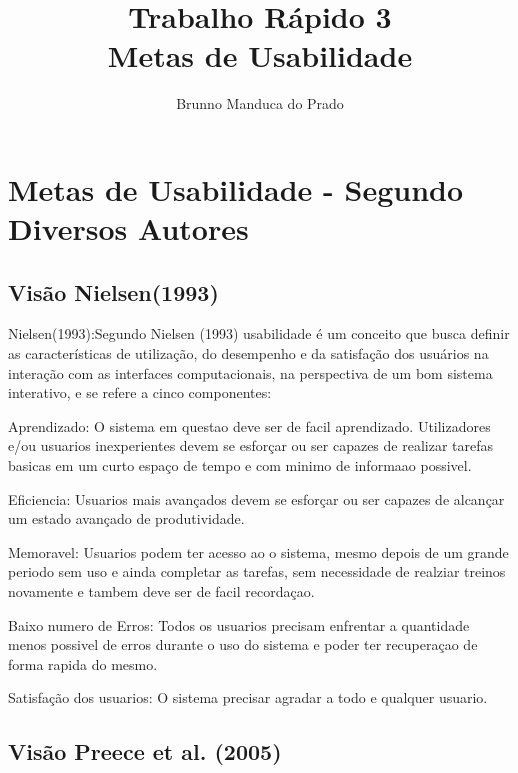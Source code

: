 \documentclass[12pt]{article}
\title{Trabalho Rápido 3\\Metas de Usabilidade}
\author{Brunno Manduca do Prado}
\begin{document}
 

\maketitle

\begin{abstract}

\end{abstract}
     
\begin{resumo} 

\end{resumo}


\section{Metas de Usabilidade - Segundo Diversos Autores\\}

\subsection{Visão Nielsen(1993)}

		Nielsen(1993):Segundo Nielsen (1993) usabilidade é um conceito que busca definir as características de 
	utilização, do desempenho e da satisfação dos usuários na interação com as interfaces 
	computacionais, na perspectiva de um bom sistema interativo, e se refere a cinco componentes: 

	Aprendizado: O sistema em questao deve ser de facil aprendizado. Utilizadores e/ou usuarios inexperientes
	devem se esforçar ou ser capazes de realizar tarefas basicas em um curto espaço de tempo e com minimo de informaao possivel.

	Eficiencia: Usuarios mais avançados devem se esforçar ou ser capazes de alcançar um estado avançado de produtividade.

	Memoravel: Usuarios podem ter acesso ao o sistema, mesmo depois de um grande periodo sem uso e ainda completar as tarefas,
	sem necessidade de realziar treinos novamente e tambem deve ser de facil recordaçao.

	Baixo numero de Erros: Todos os usuarios precisam enfrentar a quantidade menos possivel de erros durante o uso do sistema e 
	poder ter recuperaçao de forma rapida do mesmo.

	Satisfação dos usuarios: O sistema precisar agradar a todo e qualquer usuario.

\subsection{Visão Preece et al. (2005)}
\end{document}
